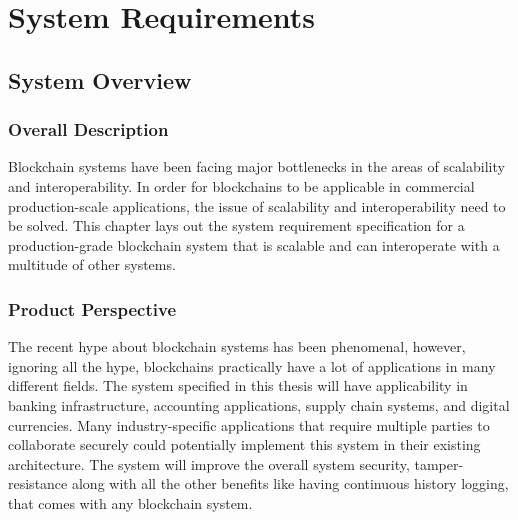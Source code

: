\documentclass[a4paper,twoside,phd]{BYUPhys}
\begin{document}
\chapter{System Requirements}
\label{chap:singleuser}

\section{System Overview \label{sec:Intro-ChapUserSelec}}
\subsection{Overall Description}
Blockchain systems have been facing major bottlenecks in the areas of scalability and interoperability. In order for blockchains to be applicable in commercial production-scale applications, the issue of scalability and interoperability need to be solved. This chapter lays out the system requirement specification for a production-grade blockchain system that is scalable and can interoperate with a multitude of other systems.
\subsection{Product Perspective}
The recent hype about blockchain systems has been phenomenal, however, ignoring all the hype, blockchains practically have a lot of applications in many different fields. The system specified in this thesis will have applicability in banking infrastructure, accounting applications, supply chain systems, and digital currencies. Many industry-specific applications that require multiple parties to collaborate securely could potentially implement this system in their existing architecture. The system will improve the overall system security, tamper-resistance along with all the other benefits like having continuous history logging, that comes with any blockchain system.
\end{document}
